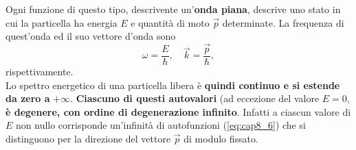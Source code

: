 Ogni funzione di questo tipo, descrivente un'\textbf{onda piana}, descrive uno stato in cui la particella ha energia $E$ e quantità di moto $\vec{p}$ determinate. La frequenza di quest'onda ed il suo vettore d'onda sono
\begin{equation}
\omega = \frac{E}{\hbar}, \quad \vec{k}= \frac{\vec{p}}{\hbar},
\end{equation}
rispettivamente.\\
Lo spettro energetico di una particella libera è \textbf{quindi continuo e si estende da zero a} $+\infty$. \textbf{Ciascuno di questi autovalori} (ad eccezione del valore $E=0$, \textbf{è degenere, con ordine di degenerazione infinito}. Infatti a ciascun valore di $E$ non nullo corrisponde un'infinità di autofunzioni (\ref{eq:cap8_6}) che si distinguono per la direzione del vettore $\vec{p}$ di modulo fissato.

